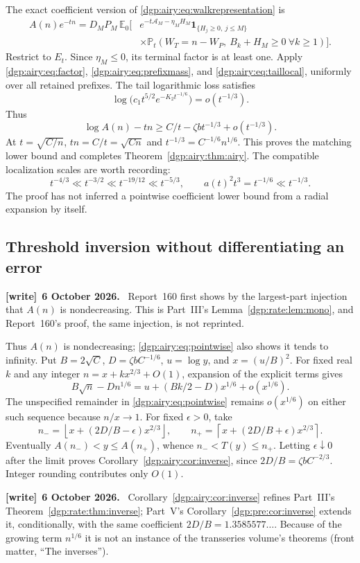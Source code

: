 \documentclass[11pt,letterpaper]{article}
\numberwithin{equation}{section}
\theoremstyle{remark}\newtheorem{remark}[theorem]{Remark}
\newcommand{\PP}{\mathbb P}
\newcommand{\EE}{\mathbb E}
\newcommand{\floor}[1]{\left\lfloor #1\right\rfloor}
\newcommand{\ceil}[1]{\left\lceil #1\right\rceil}
\newcommand{\one}{\mathbf 1}
\newcommand{\area}{\mathcal A}
\newenvironment{writenote}[1][]{\par\smallskip\begingroup\small
 \noindent\textbf{[write]}\if\relax\detokenize{#1}\relax\else~\textbf{#1.}\fi\ }%
 {\par\endgroup\smallskip}
\begin{document}
The exact coefficient version of \eqref{dgp:airy:eq:walkrepresentation} is
\begin{align}
 A(n)e^{-tn}=D_MP_M\,
 \EE_0\bigl[&e^{-t\area_M-\eta_MH_M}
      \one_{\{H_j\geq0,\ j\leq M\}}\nonumber\\[-2pt]
 &\times\PP_t(W_T=n-W_P,\ B_k+H_M\geq0\ \forall k\geq1)\bigr].
                                                        \label{dgp:airy:eq:coefficientexact}
\end{align}
Restrict to $E_t$. Since $\eta_M\leq0$, its terminal factor is at
least one. Apply \eqref{dgp:airy:eq:factor}, \eqref{dgp:airy:eq:prefixmass}, and
\eqref{dgp:airy:eq:taillocal}, uniformly over all retained prefixes.
The tail logarithmic loss satisfies
\[
 \log\bigl(c_1t^{5/2}e^{-K_2t^{-1/6}}\bigr)=o(t^{-1/3}).
\]
Thus
\[
 \log A(n)-tn\geq C/t-\zeta b t^{-1/3}+o(t^{-1/3}).
\]
At $t=\sqrt{C/n}$, $tn=C/t=\sqrt{Cn}$ and
$t^{-1/3}=C^{-1/6}n^{1/6}$. This proves the matching lower bound and
completes Theorem~\ref{dgp:airy:thm:airy}.
The compatible localization scales are worth recording:
\[
 t^{-4/3}\ll t^{-3/2}\ll t^{-19/12}\ll t^{-5/3},
 \qquad a(t)^2t^3=t^{-1/6}\ll t^{-1/3}.
\]
The proof has not inferred a pointwise coefficient lower bound from
a radial expansion by itself.

\subsection{Threshold inversion without differentiating an error}
\begin{writenote}[6 October 2026]
Report~160 first shows by the largest-part injection that $A(n)$ is nondecreasing. This is Part~III's Lemma~\ref{dgp:rate:lem:mono}, and Report~160's proof, the same injection, is not reprinted.
\end{writenote}
Thus $A(n)$ is nondecreasing; \eqref{dgp:airy:eq:pointwise} also shows it tends
to infinity.
Put $B=2\sqrt C$, $D=\zeta b C^{-1/6}$, $u=\log y$, and
$x=(u/B)^2$. For fixed real $k$ and any integer
$n=x+kx^{2/3}+O(1)$, expansion of the explicit terms gives
\[
 B\sqrt n-Dn^{1/6}=u+(Bk/2-D)x^{1/6}+o(x^{1/6}).
\]
The unspecified remainder in \eqref{dgp:airy:eq:pointwise} remains
$o(x^{1/6})$ on either such sequence because $n/x\to1$.
For fixed $\epsilon>0$, take
\[
 n_- =\floor{x+(2D/B-\epsilon)x^{2/3}},\qquad
 n_+ =\ceil{x+(2D/B+\epsilon)x^{2/3}}.
\]
Eventually $A(n_-)<y\leq A(n_+)$, whence
$n_-<T(y)\leq n_+$. Letting $\epsilon\downarrow0$ after the limit
proves Corollary~\ref{dgp:airy:cor:inverse}, since
$2D/B=\zeta b C^{-2/3}$. Integer rounding contributes only $O(1)$.
\begin{writenote}[6 October 2026]
Corollary~\ref{dgp:airy:cor:inverse} refines Part~III's Theorem~\ref{dgp:rate:thm:inverse}; Part~V's Corollary~\ref{dgp:pre:cor:inverse} extends it, conditionally, with the same coefficient $2D/B=1.3585577\ldots$. Because of the growing term $n^{1/6}$ it is not an instance of the transseries volume's theorems (front matter, ``The inverses'').
\end{writenote}
\end{document}
